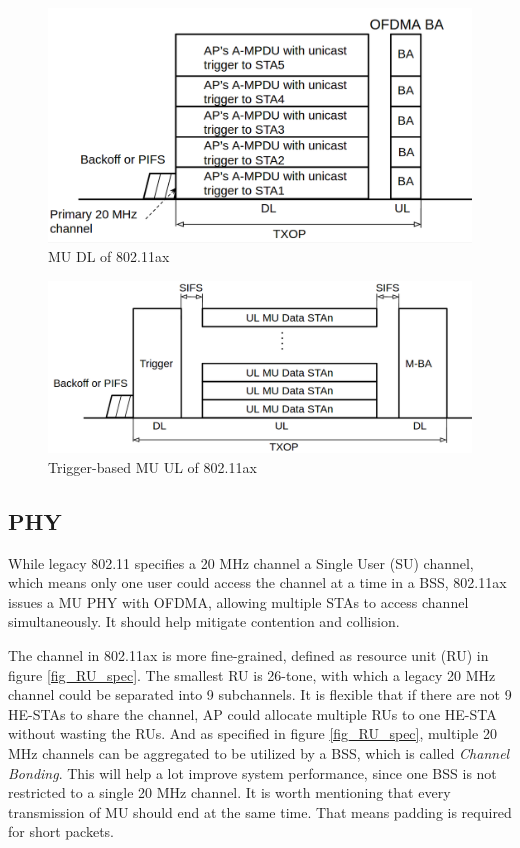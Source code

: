 \begin{figure}[!t]
\includegraphics[scale=0.4]{./figure/chp2/fig_MU_DL.png}
\caption{MU DL of 802.11ax\cite{draft_ax}}
\label{fig_MU_DL}
\end{figure}

\begin{figure}[!h]
\includegraphics[scale=0.36]{./figure/chp2/fig_MU_UL.png}
\caption{Trigger-based MU UL of 802.11ax\cite{draft_ax}}
\label{fig_MU_UL}
\end{figure}

\subsection{PHY}
While legacy 802.11 specifies a 20 MHz channel a Single User (SU) channel, which means only one user could access the channel at a time in a BSS, 802.11ax issues a MU PHY with OFDMA, allowing multiple STAs to access channel simultaneously.
It should help mitigate contention and collision. 

The channel in 802.11ax is more fine-grained, defined as resource unit (RU) in figure \ref{fig_RU_spec}. 
The smallest RU is 26-tone, with which a legacy 20 MHz channel could be separated into 9 subchannels.
It is flexible that if there are not 9 HE-STAs to share the channel, AP could allocate multiple RUs to one HE-STA without wasting the RUs.
And as specified in figure \ref{fig_RU_spec}, multiple 20 MHz channels can be aggregated to be utilized by a BSS, which is called \textit{Channel Bonding}. 
This will help a lot improve system performance, since one BSS is not restricted to a single 20 MHz channel.  
It is worth mentioning that every transmission of MU should end at the same time. That means padding is required for short packets.
 

